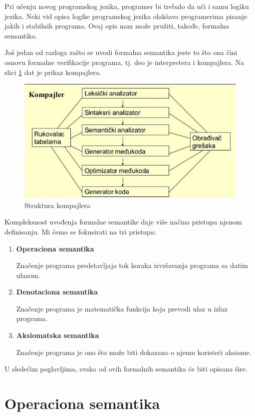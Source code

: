 \documentclass[a4paper]{article}
\begin{document}
{Pri učenju novog programskog jezika, programer bi trebalo da uči i samu logiku jezika. Neki vid opisa logike programskog jezika olakšava programerima pisanje jakih i stabilnih programa.  Ovaj opis nam može pružiti, takođe, formalna semantika.

Još jedan od razloga zašto se uvodi formalna semantika jeste to što ona čini osnovu formalne verifikacije programa, tj. deo je interpretera i kompajlera. Na slici \ref{fig:kompajler} dat je prikaz kompajlera.

\begin{figure}[h!]
\begin{center}
\includegraphics[scale=0.5]{kompajler.jpg}
\end{center}
\caption{Struktura kompajlera \cite{slika}}
\label{fig:kompajler}
\end{figure}

Kompleksnost uvođenja formalne semantike daje više načina pristupa njenom definisanju. Mi ćemo se fokusirati na tri pristupa:
\begin{enumerate}
  \item \textbf{Operaciona semantika}

  Značenje programa predstavljaja tok koraka izvršavanja programa sa datim ulazom.
  \item \textbf{Denotaciona semantika}

  Značenje programa je matematička funkcija koja prevodi ulaz u izlaz programa.
  \item \textbf{Aksiomatska semantika}

  Značenje programa je ono što može biti dokazano o njemu koristeći aksiome.
\end{enumerate}

U sledećim poglavljima, svaka od ovih formalnih semantika će biti opisana šire.
\section{Operaciona semantika}
\label{sec:opsem}

}
\end{document}
